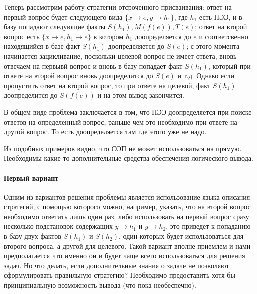 Теперь рассмотрим работу стратегии отсроченного присваивания: ответ на первый вопрос будет следующего вида $\{ x\rightarrow e, y\rightarrow h_1 \}$, где $h_1$ есть НЭЭ, и в базу попадают следующие факты $S(h_1),M(f(e)),T(e)$; ответ на второй вопрос есть $\{ x\rightarrow e, h_1\rightarrow e \}$ в котором $h_1$ доопределяется до $e$ и соответсвенно находящийся в базе факт $S(h_1)$ доопределяется до $S(e)$; с этого момента начинается зацикливание, поскольки целевой вопрос не имеет ответа, вновь отвечаем на первывй вопрос и вновь в базу попадает факт $S(h_1)$, который при ответе на второй вопрос вновь доопределится до $S(e)$ и т.д. Однако если пропустить ответ на второй вопрос, то при ответе на целевой, факт $S(h_1)$ доопределится до $S(f(e))$ и на этом вывод закончится. 

В общем виде проблема заключается в том, что НЭЭ доопределяется при поиске ответов на определенный вопрос, раньше чем это необходимо при ответе на другой вопрос. То есть доопределяется там где этого уже не надо.

Из подобных примеров видно, что СОП не может использоваться на прямую. Необходимы какие-то дополнительные средства обеспечения логического вывода.

\paragraph{Первый вариант} 
Одним из вариантов решения проблемы является использование языка описания стратегий, с помощью которого можно, например, указать, что на второй вопрос необходимо ответить лишь один раз, либо использовать на первый вопрос сразу несколько подстановок содержащих $y\rightarrow h_1$ и $y\rightarrow h_2$, это приведет к попаданию в базу двух фактов $S(h_1)$ и $S(h_2)$, один которых будет использоваться для второго вопроса, а другой для целевого. Такой вариант вполне приемлем и нами предполагается что именно он и будет чаще всего использоваться для решения задач. Но что делать, если дополнительные знания о задаче не позволяют сформулировать правильную стратегию? Необходимо предоставить хотя бы принципиальную возможность вывода (что пока необеспечно).

